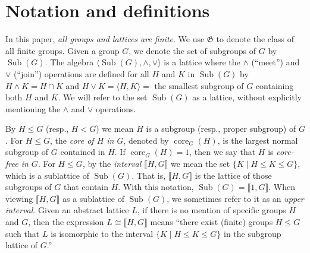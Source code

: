 \documentclass{gen-j-l}
\newcommand{\lb}{\ensuremath{\llbracket}}
\newcommand{\rb}{\ensuremath{\rrbracket}}
\newcommand{\<}{\ensuremath{\langle}}
\renewcommand{\>}{\ensuremath{\rangle}}
\theoremstyle{plain}
\theoremstyle{definition}
\theoremstyle{remark}
\numberwithin{theorem}{section}
\numberwithin{claim}{section}
\numberwithin{equation}{section}
\numberwithin{conjecture}{section}
\newcommand{\defn}[1]{\emph{#1}}
\renewcommand{\leq}{\ensuremath{\leqslant}}
\newcommand{\meet}{\ensuremath{\wedge}}
\newcommand{\join}{\ensuremath{\vee}}
\newcommand{\Sub}{\ensuremath{\operatorname{Sub}}}
\newcommand{\core}{\ensuremath{\operatorname{core}}}
\newcommand{\2}{\ensuremath{\mathbf{2}}}
\newcommand{\3}{\ensuremath{\mathbf{3}}}
\newcommand{\G}{\ensuremath{\mathfrak{G}}}
\begin{document}
\section{Notation and definitions}
\label{sec:notation-definitions}
In this paper, \emph{all groups and lattices are finite}.  We use 
$\G$ to denote the class of all finite groups.
Given a group $G$, we denote the set of subgroups of $G$ by $\Sub(G)$.  The
algebra $\<\Sub(G), \meet, \join\>$ is a lattice where the $\meet$ (``meet'') and
$\join$ (``join'') operations are defined for all $H$ and $K$ in $\Sub(G)$ by
$H\meet K = H\cap K$ and $H\join K = \<H, K\> = $ the smallest subgroup of $G$
containing both $H$ and $K$.  We will refer to the set
$\Sub(G)$ as a lattice, without explicitly mentioning the $\meet$ and
$\join$ operations.

By $H \leq G$ (resp.,
$H < G$) we mean $H$ is a subgroup (resp., proper subgroup) of $G$.
For $H\leq G$, the
\emph{core of $H$ in $G$}, denoted by $\core_G(H)$, is the largest normal subgroup of $G$
contained in $H$.
If $\core_G(H)=1$, then we say that $H$ is \emph{core-free in $G$}.
For $H\leq G$,
by the \defn{interval} $\lb H, G \rb$ we mean 
the set $\{K \mid H\leq K \leq G\}$, which is a
sublattice of $\Sub(G)$.
That is, $\lb H,G \rb$ is the lattice of those subgroups of $G$ that contain 
$H$. 
With this notation, $\Sub(G)=\lb 1,G \rb$.
When viewing $\lb H,G \rb$ as a
sublattice of $\Sub(G)$, we sometimes refer to it as an \defn{upper interval}. 
Given an abstract lattice $L$, if there is no mention of specific groups $H$ and
$G$, then the expression $L \cong \lb H, G \rb$ means ``there exist (finite) groups $H
\leq G$ such that $L$ is isomorphic to the interval $\{K \mid H\leq K \leq G\}$ in
the subgroup lattice of $G$.''  
\end{document}
